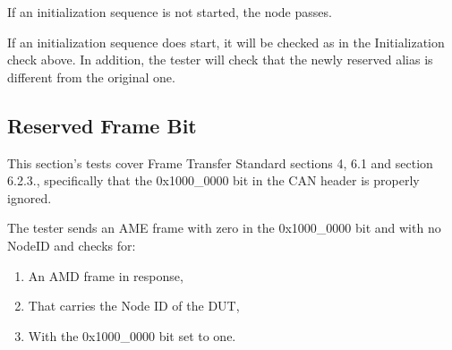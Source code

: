 \documentclass[11pt]{article}
\begin{document}
If an initialization sequence is not started, the node passes.

If an initialization sequence does start, it will be checked as in the 
Initialization check above.  In addition, the tester will check that the 
newly reserved alias is different from the original one.

\subsection{Reserved Frame Bit}

This section's tests cover Frame Transfer Standard sections 4, 6.1 and section 6.2.3., 
specifically that the 0x1000\_0000 bit in the CAN header is properly
ignored.

The tester sends an AME frame with zero in the 0x1000\_0000 bit
and with no NodeID and checks for:
\begin{enumerate}
\item An AMD frame in response,
\item That carries the Node ID of the DUT,
\item With the 0x1000\_0000 bit set to one.
\end{enumerate}
\end{document}
